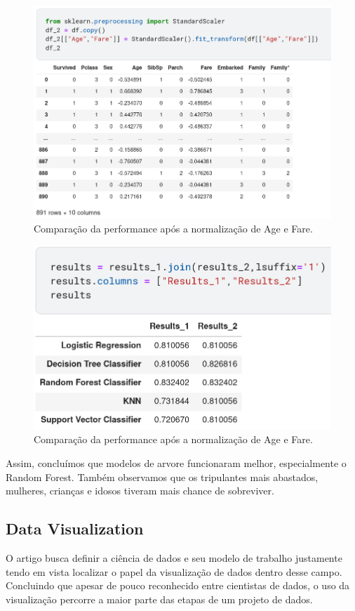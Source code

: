 \begin{figure}[H]
\centering
\includegraphics[width=\textwidth]{Figures/normalized.png}
\caption{\label{normalized}Comparação da performance após a normalização de Age e Fare.}
\end{figure}
\begin{figure}[H]
\centering
\includegraphics[width=\textwidth]{Figures/results1_2.png}
\caption{\label{ml.results2}Comparação da performance após a normalização de Age e Fare.}
\end{figure}
Assim, concluímos que modelos de arvore funcionaram melhor, especialmente o Random Forest. Também observamos que os tripulantes mais abastados, mulheres, crianças e idosos tiveram mais chance de sobreviver.

\subsection{Data Visualization}
O artigo \cite{BATON} busca definir a ciência de dados e seu modelo de trabalho justamente tendo em vista localizar o papel da visualização de dados dentro desse campo. Concluindo que apesar de pouco reconhecido entre cientistas de dados, o uso da visualização percorre a maior parte das etapas de um projeto de dados. 

